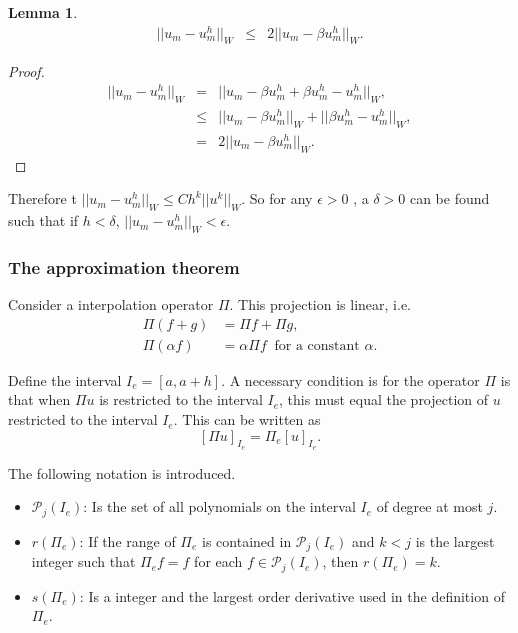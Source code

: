 \documentclass[../../main.tex]{subfiles}
\begin{document}
\newtheorem{Lem_9}[Lem_1]{Lemma} 
\begin{Lem_9}
	\label{Lem_9}
	\begin{eqnarray*}
		||u_{m} -  u_{m}^{h}||_{W} &\leq & 2||u_{m}-\beta u^{h}_{m}||_{W}.
	\end{eqnarray*}
\end{Lem_9}
\begin{proof}
	\begin{eqnarray*}
	||u_{m} - u_{m}^{h}||_{W} &=& ||u_{m} - \beta u_{m}^{h} + \beta u_{m}^{h} - u_{m}^{h}||_{W}, \\
						& \leq & ||u_{m} - \beta u_{m}^{h}||_{W} + ||\beta u_{m}^{h} - u_{m}^{h}||_{W}, \\
						& = & 2||u_{m} - \beta u_{m}^{h}||_{W}.	
	\end{eqnarray*}
\end{proof}

Therefore t $||u_{m} -  u_{m}^{h}||_{W} \leq Ch^{k}||u^{k}||_{W}$. So for any $\epsilon >0$ , a $\delta >0$ can be found such that if $h < \delta$, $||u_{m} -  u_{m}^{h}||_{W} < \epsilon$.


\subsubsection{The approximation theorem}

Consider a interpolation operator $\Pi$.\label{sym:interpolation} This projection is linear, i.e.
\begin{align*}
	\Pi(f + g) & = \Pi f + \Pi g,\\
	\Pi(\alpha f) & = \alpha \Pi f \ \text{ for a constant } \alpha. 
\end{align*}

Define the interval $I_e = [a, a+h]$. A necessary condition is for the operator $\Pi$ is that when $\Pi u$ is restricted to the interval $I_e$, this must equal the projection of $u$ restricted to the interval $I_e$. This can be written as
\begin{equation*}
	\left[ \Pi u \right]_{I_{e}} = \Pi_e [u]_{I_{e}}.
\end{equation*}

The following notation is introduced.
\begin{itemize}
	\item[] $\mathcal{P}_j(I_e)$: Is the set of all polynomials on the interval $I_e$ of degree at most $j$. \label{sym:poly}
	\item[] $r(\Pi_e)$: If the range of $\Pi_e$ is contained in $\mathcal{P}_j(I_e)$ and $k<j$ is the largest integer such that $\Pi_e f = f$ for each $f \in \mathcal{P}_j(I_e)$, then $r(\Pi_e) = k$.
	\item[] $s(\Pi_e)$: Is a integer and the largest order derivative used in the definition of $\Pi_e$.
\end{itemize}
\end{document}
